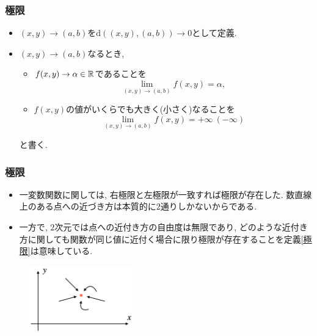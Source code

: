 

\begin{frame}
\frametitle{極限}


\begin{Def} \label{極限}
\begin{itemize}
\item $(x,y) \to (a,b)$を$\mathrm{d}((x,y),(a,b)) \to 0$として定義. 
\item $(x,y) \to (a,b)$なるとき, 
 \begin{itemize}
 \item $f(x,y)\to \alpha \in \mathbb{R}$であることを
$$
\lim_{(x,y)\to (a,b)}f(x,y)=\alpha, 
$$
\item  $f(x,y)$の値がいくらでも大きく(小さく)なることを
$$
\lim_{(x,y)\to (a,b)}f(x,y)=+ \infty \ (-\infty)
$$
\end{itemize}
と書く. 
\end{itemize}
\end{Def}

\end{frame}





\begin{frame}
\frametitle{極限}


\begin{itemize}
\item 一変数関数に関しては, 右極限と左極限が一致すれば極限が存在した. 
数直線上のある点への近づき方は本質的に$2$通りしかないからである. 
\item 一方で, $2$次元では点への近付き方の自由度は無限であり, 
どのような近付き方に関しても関数が同じ値に近付く場合に限り極限が存在することを定義\ref{極限}は意味している. 
\end{itemize}

\vspace{-3mm}

\begin{figure}[htbp]
 \begin{center} 
  \includegraphics[width=45mm]{calculus10/limit2d.png}
 \end{center}
\end{figure}

\vspace{-3mm}

\end{frame}


